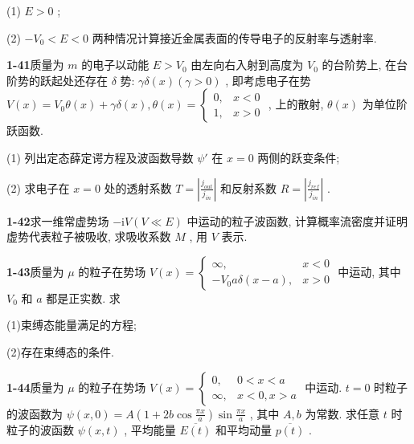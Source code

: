 (1) $E > 0$ ; 

(2) $-V_0 < E < 0$ 两种情况计算接近金属表面的传导电子的反射率与透射率.

\vfill

\newpage
\vfill

\noindent
\textbf{1-41}\quad 质量为 $m$ 的电子以动能 $E > V_{0}$ 由左向右入射到高度为 $V_{0}$ 的台阶势上, 在台阶势的跃起处还存在 $\delta$ 势: $\gamma \delta(x)(\gamma > 0)$ , 即考虑电子在势 $V(x) = V_{0} \theta(x) + \gamma \delta(x), \theta(x) = \begin{cases} 0, & x < 0 \\ 1, & x > 0 \end{cases}$ , 上的散射, $\theta(x)$ 为单位阶跃函数. 

(1) 列出定态薛定谔方程及波函数导数 $\psi'$ 在 $x = 0$ 两侧的跃变条件; 

(2) 求电子在 $x = 0$ 处的透射系数 $T = \left| \frac{j_{out}}{j_{in}} \right|$ 和反射系数 $R = \left| \frac{j_{ref}}{j_{in}} \right|$ .

\vfill

\newpage
\vfill

\noindent
\textbf{1-42}\quad 求一维常虚势场 $-\mathrm{i}V(V \ll E)$ 中运动的粒子波函数, 计算概率流密度并证明虚势代表粒子被吸收, 求吸收系数 $M$ , 用 $V$ 表示.

\vfill

\newpage
\vfill

\noindent
\textbf{1-43}\quad 质量为 $\mu$ 的粒子在势场 $V(x) = \begin{cases} \infty, & x < 0 \\ -V_0 a \delta (x - a), & x > 0 \end{cases}$ 中运动, 其中 $V_{0}$ 和 $a$ 都是正实数. 求

(1)束缚态能量满足的方程; 

(2)存在束缚态的条件.

\vfill

\newpage
\vfill

\noindent
\textbf{1-44}\quad 质量为 $\mu$ 的粒子在势场 $V(x) = \begin{cases} 0, & 0 < x < a \\ \infty, & x < 0, x > a \end{cases}$ 中运动. $t = 0$ 时粒子的波函数为 $\psi(x,0) = A\left(1 + 2b\cos \frac{\pi x}{a}\right)\sin \frac{\pi x}{a}$ , 其中 $A, b$ 为常数. 求任意 $t$ 时粒子的波函数 $\psi(x,t)$ , 平均能量 $\overline{E(t)}$ 和平均动量 $\overline{p(t)}$ .

\vfill


